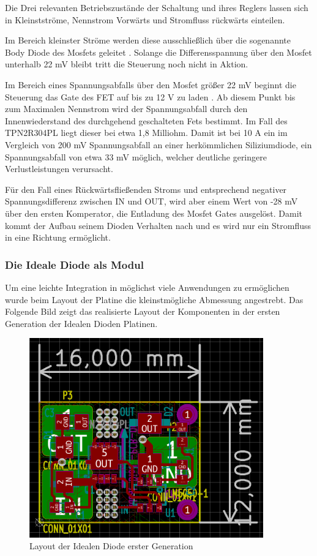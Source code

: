 Die Drei relevanten Betriebszustände der Schaltung und ihres Reglers lassen sich in Kleinstströme, Nennstrom Vorwärts und Stromfluss rückwärts einteilen.

Im Bereich kleinster Ströme werden diese ausschließlich über die sogenannte Body Diode des Mosfets geleitet \cite{Herberg2013}. Solange die Differensspannung über den Mosfet unterhalb 22 mV bleibt tritt die Steuerung noch nicht in Aktion.

Im Bereich eines Spannungsabfalls über den Mosfet größer 22 mV beginnt die Steuerung das Gate des FET auf bis zu 12 V zu laden \cite{LM5050-1}. Ab diesem Punkt bis zum Maximalen Nennstrom wird der Spannungsabfall durch den Innenwiederstand des durchgehend geschalteten Fets bestimmt. Im Fall des TPN2R304PL liegt dieser bei etwa 1,8 Milliohm. Damit ist bei 10 A ein im Vergleich von 200 mV Spannungsabfall an einer herkömmlichen Siliziumdiode, ein Spannungsabfall von etwa 33 mV möglich, welcher deutliche geringere Verlustleistungen verursacht.

Für den Fall eines Rückwärtsfließenden Stroms und entsprechend negativer Spannungsdifferenz zwischen IN und OUT, wird aber einem Wert von -28 mV über den ersten Komperator, die Entladung des Mosfet Gates ausgelöst. Damit kommt der Aufbau seinem Dioden Verhalten nach und es wird nur ein Stromfluss in eine Richtung ermöglicht.

\subsubsection{Die Ideale Diode als Modul}

Um eine leichte Integration in möglichst viele Anwendungen zu ermöglichen wurde beim Layout der Platine die kleinstmögliche Abmessung angestrebt. 
Das Folgende Bild zeigt das realisierte Layout der Komponenten in der ersten Generation der Idealen Dioden Platinen.

\begin{figure}[H]
\centering
\includegraphics[width=0.9\textwidth]{bilder/Ideale_Diode/Ideale_Diode_Mini_rev01_ver00.png} 
\caption{Layout der Idealen Diode erster Generation} 
\label{fig:Layout der Idealen Diode erster Generation}
\end{figure}

